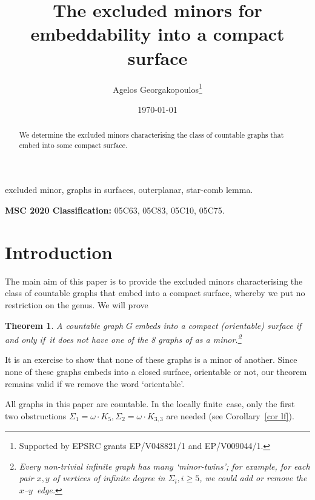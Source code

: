 \documentclass{article}
\newcommand{\Sig}{\ensuremath{\Sigma}}
\newcommand{\omdot}{\omega \cdot}
\newtheorem{theorem}[proposition]{Theorem}
\newcommand{\g}{\ensuremath{G\ }}
\newcommand{\Ktt}{\ensuremath{K_{3,3}}}
\newcommand{\Cr}[1]{Corollary~\ref{#1}}
\newcommand{\lf}{locally finite}
\renewcommand{\iff}{if and only if}
\begin{document}
	\title{The excluded minors for embeddability into a   compact surface}
	
\author{Agelos Georgakopoulos\thanks{Supported by  EPSRC grants EP/V048821/1 and EP/V009044/1.}}


\date{\today}


	
\maketitle


\begin{abstract}
We determine the excluded minors characterising the class of countable graphs that embed into some compact surface.            
\end{abstract}

\medskip

{ \small excluded minor, graphs in surfaces, outerplanar, star-comb lemma.} 

\smallskip
{\noindent \small  {\bf MSC 2020 Classification:}} 05C63, 05C83, 05C10, 05C75. 




\section{Introduction}

The main aim of this paper is to provide the excluded minors characterising the class of countable graphs that embed into a compact surface, whereby we put no restriction on the genus. We will prove
\begin{theorem}\label{main thm}
A countable graph \g embeds into a compact (orientable) surface \iff\ it does not have one of the 8 graphs of  as a minor.\footnote{Every non-trivial infinite graph has many `minor-twins'; for example, for each pair $x,y$ of vertices of infinite degree in $\Sig_i, i\geq 5$, we could add or remove the $x$--$y$~edge.}
\end{theorem}
It is an exercise to show that none of these graphs is a minor of another. Since none of these graphs embeds into a closed surface, orientable or not, our theorem remains valid if we remove the word `orientable'. 

All graphs in this paper are countable. In the \lf\ case, only the first two obstructions $\Sig_1=\omdot K_5, \Sig_2=\omdot \Ktt$ are needed (see \Cr{cor lf}).
\end{document}
